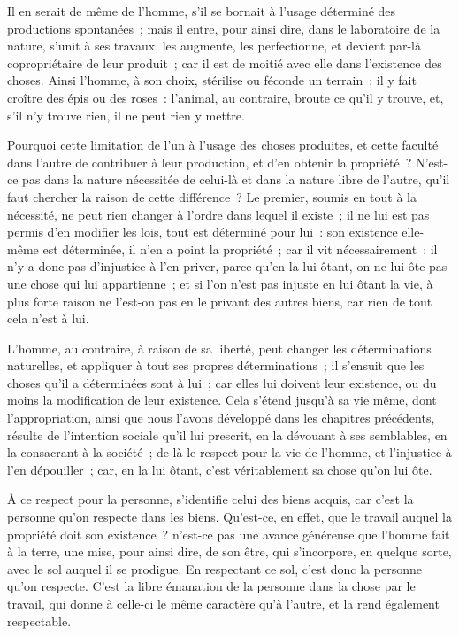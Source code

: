 \documentclass[french,twoside]{book} %
\begin{document}
Il en serait de même de l’homme, s’il se bornait à l’usage déterminé des productions spontanées ; mais il entre, pour ainsi dire, dans le laboratoire de la nature, s’unit à ses travaux, les augmente, les perfectionne, et devient par-là copropriétaire de leur produit ; car il est de moitié avec elle dans l’existence des choses. Ainsi l’homme, à son choix, stérilise ou féconde un terrain ; il y fait croître des épis ou des roses : l’animal, au contraire, broute ce qu’il y trouve, et, s’il n’y trouve rien, il ne peut rien y mettre.\par
Pourquoi cette limitation de l’un à l’usage des choses produites, et cette faculté dans l’autre de contribuer à leur production, et d’en obtenir la propriété ? N’est-ce pas dans la nature nécessitée de celui-là et dans la nature libre de l’autre, qu’il faut chercher la raison de cette différence ? Le premier, soumis en tout à la nécessité, ne peut rien changer à l’ordre dans lequel il existe ; il ne lui est pas permis d’en modifier les lois, tout est déterminé pour lui : son existence elle-même est déterminée, il n’en a point la propriété ; car il vit nécessairement : il n’y a donc pas d’injustice à l’en priver, parce qu’en la lui ôtant, on ne lui ôte pas une chose qui lui appartienne ; et si l’on n’est pas injuste en lui ôtant la vie, à plus forte raison ne l’est-on pas en le privant des autres biens, car rien de tout cela n’est à lui.\par
L’homme, au contraire, à raison de sa liberté, peut changer les déterminations naturelles, et appliquer à tout ses propres déterminations ; il s’ensuit que les choses qu’il a déterminées sont à lui ; car elles lui doivent leur existence, ou du moins la modification de leur existence. Cela s’étend jusqu’à sa vie même, dont l’appropriation, ainsi que nous l’avons développé dans les chapitres précédents, résulte de l’intention sociale qu’il lui prescrit, en la dévouant à ses semblables, en la consacrant à la société ; de là le respect pour la vie de l’homme, et l’injustice à l’en dépouiller ; car, en la lui ôtant, c’est véritablement sa chose qu’on lui ôte.\par
À ce respect pour la personne, s’identifie celui des biens acquis, car c’est la personne qu’on respecte dans les biens. Qu’est-ce, en effet, que le travail auquel la propriété doit son existence ? n’est-ce pas une avance généreuse que l’homme fait à la terre, une mise, pour ainsi dire, de son être, qui s’incorpore, en quelque sorte, avec le sol auquel il se prodigue. En respectant ce sol, c’est donc la personne qu’on respecte. C’est la libre émanation de la personne dans la chose par le travail, qui donne à celle-ci le même caractère qu’à l’autre, et la rend également respectable.\par
\end{document}
